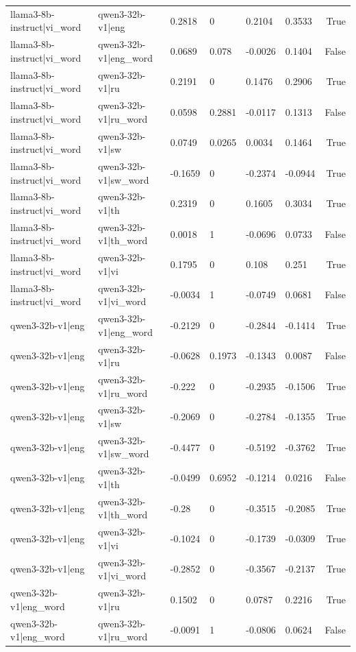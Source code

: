 \begin{table}
\begin{tabular}{llllllr}
llama3-8b-instruct|vi_word & qwen3-32b-v1|eng & 0.2818 & 0 & 0.2104 & 0.3533 & True \\
llama3-8b-instruct|vi_word & qwen3-32b-v1|eng_word & 0.0689 & 0.078 & -0.0026 & 0.1404 & False \\
llama3-8b-instruct|vi_word & qwen3-32b-v1|ru & 0.2191 & 0 & 0.1476 & 0.2906 & True \\
llama3-8b-instruct|vi_word & qwen3-32b-v1|ru_word & 0.0598 & 0.2881 & -0.0117 & 0.1313 & False \\
llama3-8b-instruct|vi_word & qwen3-32b-v1|sw & 0.0749 & 0.0265 & 0.0034 & 0.1464 & True \\
llama3-8b-instruct|vi_word & qwen3-32b-v1|sw_word & -0.1659 & 0 & -0.2374 & -0.0944 & True \\
llama3-8b-instruct|vi_word & qwen3-32b-v1|th & 0.2319 & 0 & 0.1605 & 0.3034 & True \\
llama3-8b-instruct|vi_word & qwen3-32b-v1|th_word & 0.0018 & 1 & -0.0696 & 0.0733 & False \\
llama3-8b-instruct|vi_word & qwen3-32b-v1|vi & 0.1795 & 0 & 0.108 & 0.251 & True \\
llama3-8b-instruct|vi_word & qwen3-32b-v1|vi_word & -0.0034 & 1 & -0.0749 & 0.0681 & False \\
qwen3-32b-v1|eng & qwen3-32b-v1|eng_word & -0.2129 & 0 & -0.2844 & -0.1414 & True \\
qwen3-32b-v1|eng & qwen3-32b-v1|ru & -0.0628 & 0.1973 & -0.1343 & 0.0087 & False \\
qwen3-32b-v1|eng & qwen3-32b-v1|ru_word & -0.222 & 0 & -0.2935 & -0.1506 & True \\
qwen3-32b-v1|eng & qwen3-32b-v1|sw & -0.2069 & 0 & -0.2784 & -0.1355 & True \\
qwen3-32b-v1|eng & qwen3-32b-v1|sw_word & -0.4477 & 0 & -0.5192 & -0.3762 & True \\
qwen3-32b-v1|eng & qwen3-32b-v1|th & -0.0499 & 0.6952 & -0.1214 & 0.0216 & False \\
qwen3-32b-v1|eng & qwen3-32b-v1|th_word & -0.28 & 0 & -0.3515 & -0.2085 & True \\
qwen3-32b-v1|eng & qwen3-32b-v1|vi & -0.1024 & 0 & -0.1739 & -0.0309 & True \\
qwen3-32b-v1|eng & qwen3-32b-v1|vi_word & -0.2852 & 0 & -0.3567 & -0.2137 & True \\
qwen3-32b-v1|eng_word & qwen3-32b-v1|ru & 0.1502 & 0 & 0.0787 & 0.2216 & True \\
qwen3-32b-v1|eng_word & qwen3-32b-v1|ru_word & -0.0091 & 1 & -0.0806 & 0.0624 & False \\

\end{tabular}
\end{table}

